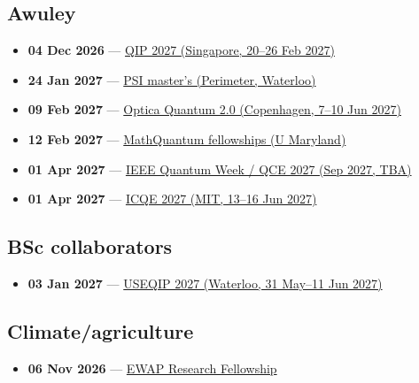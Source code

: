 \subsection*{Awuley}
\begin{itemize}[leftmargin=1.4em,itemsep=0.1em]
  \item \textbf{04 Dec 2026} --- \href{https://qipconference.org/2027/call/}{QIP 2027 (Singapore, 20--26 Feb 2027)}
  \item \textbf{24 Jan 2027} --- \href{https://perimeterinstitute.ca/training/masters-program/psi-how-apply}{PSI master's (Perimeter, Waterloo)}
  \item \textbf{09 Feb 2027} --- \href{https://www.optica.org/events/topical_meetings/quantum/submit_a_paper/}{Optica Quantum 2.0 (Copenhagen, 7--10 Jun 2027)}
  \item \textbf{12 Feb 2027} --- \href{https://mathquantum.umd.edu/apply/}{MathQuantum fellowships (U Maryland)}
  \item \textbf{01 Apr 2027} --- \href{https://qce.quantum.ieee.org/2026/}{IEEE Quantum Week / QCE 2027 (Sep 2027, TBA)}
  \item \textbf{01 Apr 2027} --- \href{https://icqe.mit.edu/}{ICQE 2027 (MIT, 13--16 Jun 2027)}
\end{itemize}

\subsection*{BSc collaborators}
\begin{itemize}[leftmargin=1.4em,itemsep=0.1em]
  \item \textbf{03 Jan 2027} --- \href{https://uwaterloo.ca/institute-for-quantum-computing/events/undergraduate-school-experimental-quantum-information-0}{USEQIP 2027 (Waterloo, 31 May--11 Jun 2027)}
\end{itemize}

\subsection*{Climate/agriculture}
\begin{itemize}[leftmargin=1.4em,itemsep=0.1em]
  \item \textbf{06 Nov 2026} --- \href{https://ewap-project.org/fellowship}{EWAP Research Fellowship}
\end{itemize}

